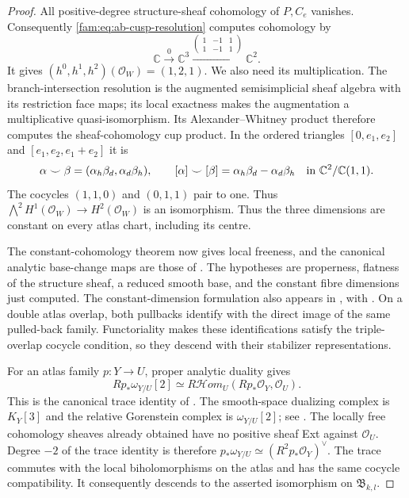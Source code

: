 \begin{proof}
All positive-degree structure-sheaf cohomology of $P,C_e$ vanishes.
Consequently \eqref{fam:eq:ab-cusp-resolution} computes cohomology by
\[
 \mathbb C\xrightarrow{0}\mathbb C^3
 \xrightarrow{\left(\begin{smallmatrix}1&-1&1\\1&-1&1\end{smallmatrix}\right)}
 \mathbb C^2.
\]
It gives $(h^0,h^1,h^2)(\mathcal O_W)=(1,2,1)$.
We also need its multiplication. The branch-intersection resolution
is the augmented semisimplicial sheaf algebra with its restriction face
maps; its local exactness makes the augmentation a multiplicative
quasi-isomorphism. Its Alexander--Whitney product therefore computes
the sheaf-cohomology cup product. In the ordered triangles
$[0,e_1,e_2]$ and $[e_1,e_2,e_1+e_2]$ it is
\[
 \alpha\smile\beta=(\alpha_h\beta_d,\alpha_d\beta_h),
 \qquad [\alpha]\smile[\beta]
 =\alpha_h\beta_d-\alpha_d\beta_h
 \quad\hbox{in }\mathbb C^2/\mathbb C(1,1).
\]
The cocycles $(1,1,0)$ and $(0,1,1)$ pair to one. Thus
$\bigwedge^2H^1(\mathcal O_W)\to H^2(\mathcal O_W)$ is an
isomorphism.
Thus the three dimensions are constant on every
atlas chart, including its centre.

The constant-cohomology theorem
\cite[Chapter III, Theorem 4.12(ii), pp.~134--135]{BS76}
now gives local freeness, and the canonical analytic base-change
maps are those of
\cite[Chapter III, Theorem 4.10, pp.~132--133]{BS76}.
The hypotheses are properness, flatness of the structure sheaf,
a reduced smooth base, and the constant fibre dimensions just
computed. The constant-dimension formulation also appears in
\cite[Section 7, Satz 5, pp.~63--64]{Grauert60}, with
\cite[pp.~35--36]{Grauert1963ErratumD}.
On a double atlas overlap, both pullbacks identify with the direct
image of the same pulled-back family. Functoriality makes these
identifications satisfy the triple-overlap cocycle condition, so
they descend with their stabilizer representations.

For an atlas family $p:Y\to U$, proper analytic duality gives
\[
 Rp_*\omega_{Y/U}[2]
 \simeq R\mathcal Hom_U(Rp_*\mathcal O_Y,\mathcal O_U).
\]
This is the canonical trace identity of
\cite[introduction, equation (1), p.~261; Section 1, pp.~264--265;
Proposition 2.1, p.~266]{RRV71}.
The smooth-space dualizing complex is $K_Y[3]$ and the relative
Gorenstein complex is $\omega_{Y/U}[2]$; see
\cite[Section 3, Theorem 1, p.~81; Proposition 2 and the
complete-intersection calculation, p.~91]{RR70push}.
The locally free cohomology sheaves already obtained have no
positive sheaf Ext against $\mathcal O_U$. Degree $-2$ of the
trace identity is therefore
$p_*\omega_{Y/U}\simeq(R^2p_*\mathcal O_Y)^\vee$.
The trace commutes with the local biholomorphisms on the atlas
and has the same cocycle compatibility. It consequently descends
to the asserted isomorphism on $\mathfrak B_{k,l}$.
\end{proof}